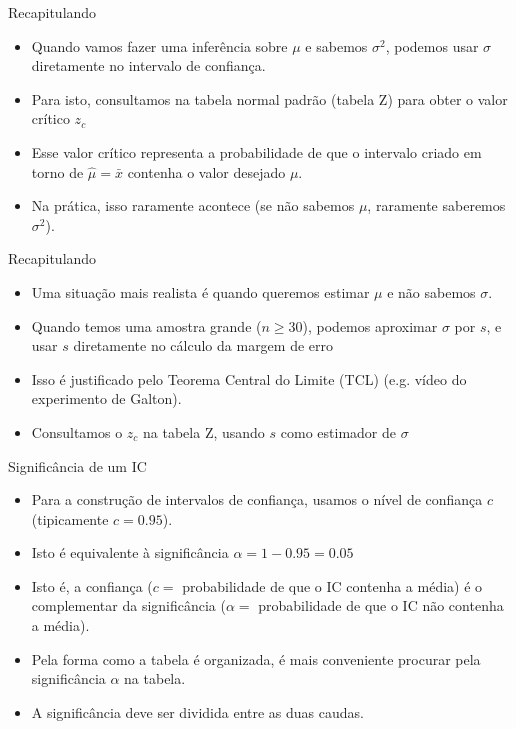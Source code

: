 \documentclass{beamer}
\begin{document}
\begin{frame}{Recapitulando}
  \begin{itemize}
  \item Quando vamos fazer uma inferência sobre $\mu$ e
    \alert{sabemos} $\sigma^2$, podemos usar $\sigma$ diretamente no
    intervalo de confiança.
  \item Para isto, consultamos na tabela normal padrão (tabela Z) para
    obter o valor crítico $z_c$
  \item Esse valor crítico representa a probabilidade de que o
    intervalo criado em torno de $\hat{\mu} = \bar{x}$ contenha o
    valor desejado $\mu$.
  \item Na prática, isso raramente acontece (se não sabemos $\mu$,
    raramente saberemos $\sigma^2$).
  \end{itemize}
\end{frame}

\begin{frame}{Recapitulando}
  \begin{itemize}
  \item Uma situação mais realista é quando queremos estimar $\mu$ e
    não sabemos $\sigma$.
  \item Quando temos uma \alert{amostra grande} ($n \ge 30$), podemos
    aproximar $\sigma$ por $s$, e usar $s$ diretamente no cálculo
    da margem de erro
  \item Isso é justificado pelo Teorema Central do Limite (TCL) (e.g.
    vídeo do experimento de Galton).
  \item Consultamos o $z_c$ na tabela Z, usando $s$ como estimador de
    $\sigma$
  \end{itemize}
\end{frame}

\begin{frame}{Significância de um IC}
  \begin{itemize}
  \item Para a construção de intervalos de confiança, usamos o nível
    de confiança $c$ (tipicamente $c=0.95$).
  \item Isto é equivalente à \alert{significância} $\alpha = 1-0.95 =
    0.05$
  \item Isto é, a confiança ($c=$ probabilidade de que o IC contenha a
    média) é o complementar da significância ($\alpha=$ probabilidade de que o
    IC não contenha a média).
  \item Pela forma como a tabela é organizada, é mais conveniente
    procurar pela significância $\alpha$ na tabela.
  \item A significância deve ser dividida entre as duas caudas.
  \end{itemize}
\end{frame}
\end{document}
